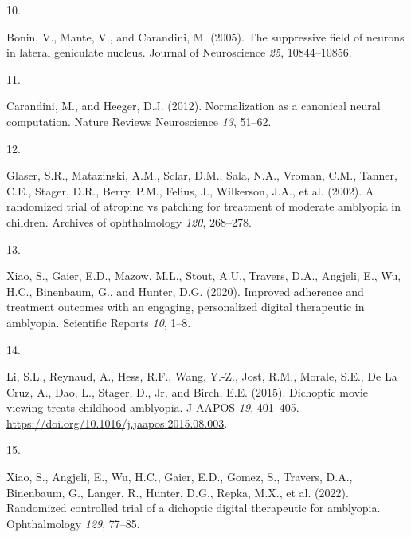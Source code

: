 \documentclass[
]{article}
\newlength{\cslhangindent}
\newlength{\csllabelwidth}
\newenvironment{CSLReferences}[2] %
 {\begin{list}{}{%
  \setlength{\itemindent}{0pt}
  \setlength{\leftmargin}{0pt}
  \setlength{\parsep}{0pt}
  \ifodd #1
   \setlength{\leftmargin}{\cslhangindent}
   \setlength{\itemindent}{-1\cslhangindent}
  \fi
  \setlength{\itemsep}{#2\baselineskip}}}
 {\end{list}}
\newcommand{\CSLLeftMargin}[1]{\parbox[t]{\csllabelwidth}{\strut#1\strut}}
\newcommand{\CSLRightInline}[1]{\parbox[t]{\linewidth - \csllabelwidth}{\strut#1\strut}}
\begin{document}
\begin{CSLReferences}{0}{1}
\CSLLeftMargin{10. }%
\CSLRightInline{Bonin, V., Mante, V., and Carandini, M. (2005). The
suppressive field of neurons in lateral geniculate nucleus. Journal of
Neuroscience \emph{25}, 10844--10856.}

\CSLLeftMargin{11. }%
\CSLRightInline{Carandini, M., and Heeger, D.J. (2012). Normalization as
a canonical neural computation. Nature Reviews Neuroscience \emph{13},
51--62.}

\CSLLeftMargin{12. }%
\CSLRightInline{Glaser, S.R., Matazinski, A.M., Sclar, D.M., Sala, N.A.,
Vroman, C.M., Tanner, C.E., Stager, D.R., Berry, P.M., Felius, J.,
Wilkerson, J.A., et al. (2002). A randomized trial of atropine vs
patching for treatment of moderate amblyopia in children. Archives of
ophthalmology \emph{120}, 268--278.}

\CSLLeftMargin{13. }%
\CSLRightInline{Xiao, S., Gaier, E.D., Mazow, M.L., Stout, A.U.,
Travers, D.A., Angjeli, E., Wu, H.C., Binenbaum, G., and Hunter, D.G.
(2020). Improved adherence and treatment outcomes with an engaging,
personalized digital therapeutic in amblyopia. Scientific Reports
\emph{10}, 1--8.}

\CSLLeftMargin{14. }%
\CSLRightInline{Li, S.L., Reynaud, A., Hess, R.F., Wang, Y.-Z., Jost,
R.M., Morale, S.E., De La Cruz, A., Dao, L., Stager, D., Jr, and Birch,
E.E. (2015). Dichoptic movie viewing treats childhood amblyopia. J AAPOS
\emph{19}, 401--405.
\url{https://doi.org/10.1016/j.jaapos.2015.08.003}.}

\CSLLeftMargin{15. }%
\CSLRightInline{Xiao, S., Angjeli, E., Wu, H.C., Gaier, E.D., Gomez, S.,
Travers, D.A., Binenbaum, G., Langer, R., Hunter, D.G., Repka, M.X., et
al. (2022). Randomized controlled trial of a dichoptic digital
therapeutic for amblyopia. Ophthalmology \emph{129}, 77--85.}

\end{CSLReferences}
\end{document}
